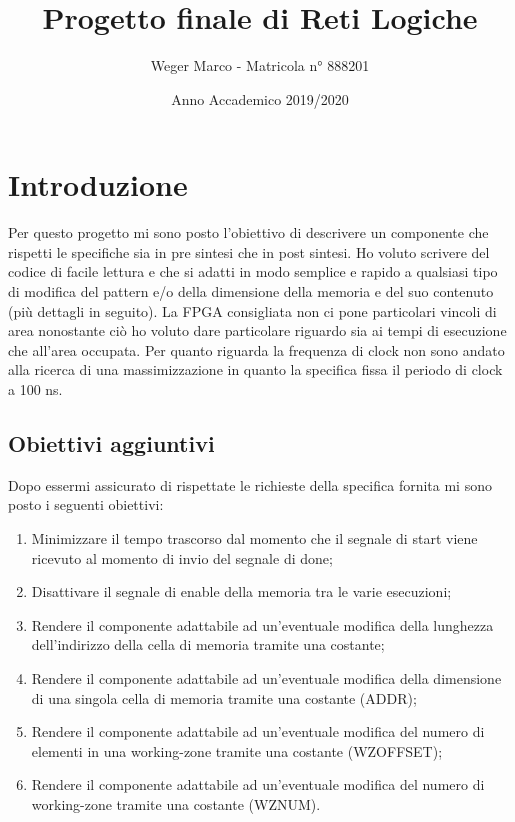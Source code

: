 \documentclass{article}
\begin{document}
\title{Progetto finale di Reti Logiche}
\author{Weger Marco - Matricola n° 888201}
\date{Anno Accademico 2019/2020}
\maketitle

\tableofcontents

\newpage
{}
\section{Introduzione}
Per questo progetto mi sono posto l'obiettivo di descrivere un componente che rispetti le specifiche sia in pre sintesi che in post sintesi.
Ho voluto scrivere del codice di facile lettura e che si adatti in modo semplice e rapido a qualsiasi tipo di modifica del pattern e/o della dimensione della memoria e del suo contenuto (più dettagli in seguito).
La FPGA consigliata non ci pone particolari vincoli di area nonostante ciò ho voluto dare particolare riguardo sia ai tempi di esecuzione che all'area occupata.
Per quanto riguarda la frequenza di clock non sono andato alla ricerca di una massimizzazione in quanto la specifica fissa il periodo di clock a 100 ns.
\subsection{Obiettivi aggiuntivi}
Dopo essermi assicurato di rispettate le richieste della specifica fornita mi sono posto i seguenti obiettivi:
\begin{enumerate}
	\item Minimizzare il tempo trascorso dal momento che il segnale di start viene ricevuto al momento di invio del segnale di done;
	\item Disattivare il segnale di enable della memoria tra le varie esecuzioni;
	\item Rendere il componente adattabile ad un'eventuale modifica della lunghezza dell'indirizzo della cella di memoria tramite una costante;
	\item Rendere il componente adattabile ad un'eventuale modifica della dimensione di una singola cella di memoria tramite una costante (ADDR);
	\item Rendere il componente adattabile ad un'eventuale modifica del numero di elementi in una working-zone tramite una costante (WZ\textunderscore OFFSET);
	\item Rendere il componente adattabile ad un'eventuale modifica del numero di working-zone tramite una costante (WZ\textunderscore NUM).
\end{enumerate}
\end{document}
